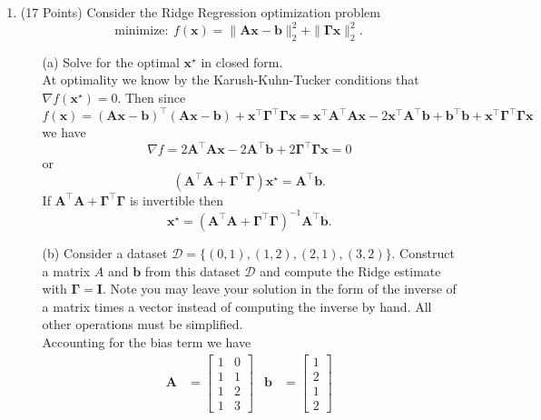 \documentclass[letter, 12pt]{article}
\begin{document}
\begin{enumerate}
\item (17 Points) Consider the Ridge Regression optimization problem
    \[
        \mathrm{minimize:}~f(\mathbf{x}) = \|\mathbf{A}\mathbf{x} - \mathbf{b}\|_2^2 + \|\mathbf{\Gamma}\mathbf{x}\|_2^2.
    \]
    \begin{enumerate}
        \item[(a)] Solve for the optimal $\mathbf{x}^\star$ in closed form.\\[1em]
            At optimality we know by the Karush-Kuhn-Tucker conditions that $\nabla f(\mathbf{x}^\star) = 0$.
            Then since $f(\mathbf{x}) = (\mathbf{A}\mathbf{x}-\mathbf{b})^\top(\mathbf{A}\mathbf{x}-\mathbf{b}) +
            \mathbf{x}^\top\mathbf{\Gamma}^\top\mathbf{\Gamma}\mathbf{x} = \mathbf{x}^\top\mathbf{A}^\top
            \mathbf{A}\mathbf{x} - 2\mathbf{x}^\top\mathbf{A}^\top\mathbf{b} + \mathbf{b}^\top\mathbf{b}
            + \mathbf{x}^\top\mathbf{\Gamma}^\top\mathbf{\Gamma}\mathbf{x}$ we have
            \[\nabla f = 2\mathbf{A}^\top\mathbf{A}\mathbf{x} - 2\mathbf{A}^\top\mathbf{b} + 2\mathbf{\Gamma}^\top
                \mathbf{\Gamma}\mathbf{x} = 0\] or \[(\mathbf{A}^\top\mathbf{A} + \mathbf{\Gamma}^\top\mathbf{\Gamma})
            \mathbf{x}^\star = \mathbf{A}^\top\mathbf{b}.\] If $\mathbf{A}^\top\mathbf{A}+\mathbf{\Gamma}^\top\mathbf{\Gamma}$
            is invertible then \[\mathbf{x}^\star = (\mathbf{A}^\top\mathbf{A}+\mathbf{\Gamma}^\top\mathbf{\Gamma})^{-1}
            \mathbf{A}^\top\mathbf{b}.\]
            \vfill
        \item[(b)] Consider a dataset $\mathcal{D} = \{(0,1), (1,2),(2,1),(3,2)\}$.
            Construct a matrix $A$ and $\mathbf{b}$ from this dataset $\mathcal{D}$ and
            compute the Ridge estimate with $\mathbf{\Gamma} = \mathbf{I}$. Note you
            may leave your solution in the form of the inverse of a matrix times a
            vector instead of computing the inverse by hand. All other operations must
            be simplified.\\[1em]
            Accounting for the bias term we have
            \begin{align*}
            \mathbf{A} &= \begin{bmatrix}1&0\\1&1\\1&2\\1&3\end{bmatrix} & \mathbf{b} &= \begin{bmatrix}1\\2\\1\\2\end{bmatrix}

\end{align*}
\end{enumerate}
\end{enumerate}
\end{document}
